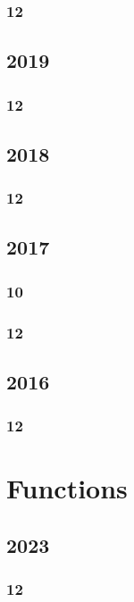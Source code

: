 \documentclass[11pt]{book}
\begin{document}
\subsection{12}

\section{2019}
\subsection{12}





\section{2018}
\subsection{12}




\section{2017}
\subsection{10}

\subsection{12}


\section{2016}
\subsection{12}





\chapter{Functions}
\section{2023}
\subsection{12}

\end{document}
